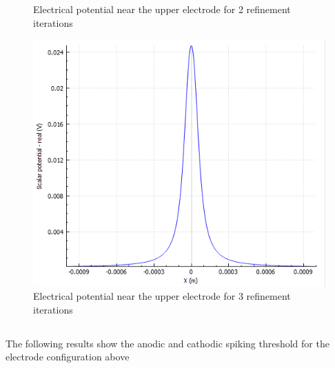 \documentclass{article}
\begin{document}
\begin{figure}[htbp]
\begin{minipage}[b]{0.3\textwidth}
            \caption{Electrical potential near the upper electrode for 2 refinement iterations}
            \label{fig:FE_efield_at_electrode_2}
        \end{minipage}
        \hfill
        \begin{minipage}[b]{0.3\textwidth}
            \includegraphics[width=\textwidth]{FE_efield_at_electrode_3}
            \caption{Electrical potential near the upper electrode for 3 refinement iterations}
            \label{fig:FE_efield_at_electrode_3}
        \end{minipage}
    \end{figure}

    \subsection{}

    The following results show the anodic and cathodic spiking threshold for the electrode configuration above
\end{document}
